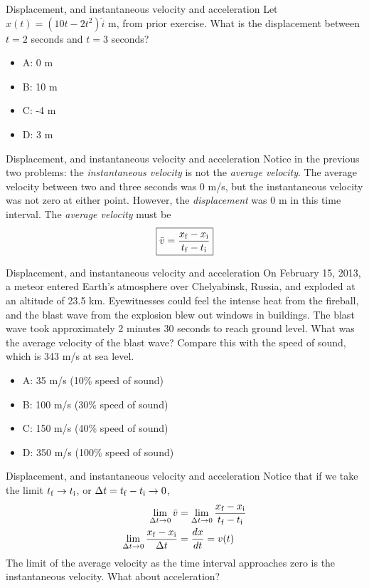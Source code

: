 \documentclass{beamer}
\begin{document}
\begin{frame}{Displacement, and instantaneous velocity and acceleration}
Let $x(t) = (10t-2t^2)\hat{i}$ m, from prior exercise.  What is the displacement between $t=2$ seconds and $t=3$ seconds?
\begin{itemize}
\item A: 0 m
\item B: 10 m
\item C: -4 m
\item D: 3 m
\end{itemize}
\end{frame}

\begin{frame}{Displacement, and instantaneous velocity and acceleration}
Notice in the previous two problems: the \textit{instantaneous velocity} is not the \textit{average velocity}.  The average velocity between two and three seconds was 0 m/s, but the instantaneous velocity was not zero at either point.  However, the \textit{displacement} was 0 m in this time interval.  The \textit{average velocity} must be \\
\begin{equation}
\boxed{\bar{v} = \frac{x_{\rm f} - x_{\rm i}}{t_{\rm f} - t_{\rm i}}} \label{eq:avevel}
\end{equation}
\end{frame}

\begin{frame}{Displacement, and instantaneous velocity and acceleration}
\small
On February 15, 2013, a meteor entered Earth’s atmosphere over Chelyabinsk, Russia, and exploded at an altitude of 23.5 km.  Eyewitnesses could feel the intense heat from the fireball, and the blast wave from the explosion blew out windows in buildings. The blast wave took approximately 2 minutes 30 seconds to reach ground level.  What was the average velocity of the blast wave?  Compare this with the speed of sound, which is 343 m/s at sea level.
\begin{itemize}
\item A: 35 m/s (10\% speed of sound)
\item B: 100 m/s (30\% speed of sound)
\item C: 150 m/s (40\% speed of sound)
\item D: 350 m/s (100\% speed of sound)
\end{itemize}
\end{frame}

\begin{frame}{Displacement, and instantaneous velocity and acceleration}
Notice that if we take the limit $t_{\rm f} \to t_{\rm i}$, or $\Delta t = t_{\rm f} - t_{\rm i} \to 0$, \\
\begin{align}
\lim_{\Delta t \to 0} \bar{v} &= \lim_{\Delta t \to 0} \frac{x_{\rm f} - x_{\rm i}}{t_{\rm f} - t_{\rm i}} \\
\lim_{\Delta t \to 0} \frac{x_{\rm f} - x_{\rm i}}{\Delta t} &= \frac{dx}{dt} = v(t)
\end{align}
The limit of the average velocity as the time interval approaches zero is the instantaneous velocity.  What about acceleration?
\end{frame}
\end{document}
